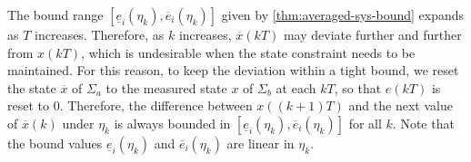 The bound range $[\underline{e}_i (\eta_k), \overbar{e}_i (\eta_k)]$ given by
\cref{thm:averaged-sys-bound} expands as $T$
increases. Therefore, as $k$ increases, $\overbar{x} (kT)$ may
deviate further and further from $x (kT)$, which is undesirable when the state
constraint needs to be maintained. For this reason, to keep the deviation
within a tight bound, we reset the state $\overbar{x}$ of $\Sigma_a$ to the
measured state $x$ of $\Sigma_b$ at each $kT$, so that $e (kT)$ is reset to
$0$. Therefore, the difference between $x ((k + 1) T)$ and the next value of
$\overbar{x} (k)$ under $\eta_k$ is always bounded in $[\underline{e}_i
(\eta_k), \overbar{e}_i (\eta_k)]$ for all $k$.
Note that the bound values $\underline{e}_i(\eta_{k})$ and $\overbar{e}_i(\eta_{k})$ are linear in $\eta_{k}$.

